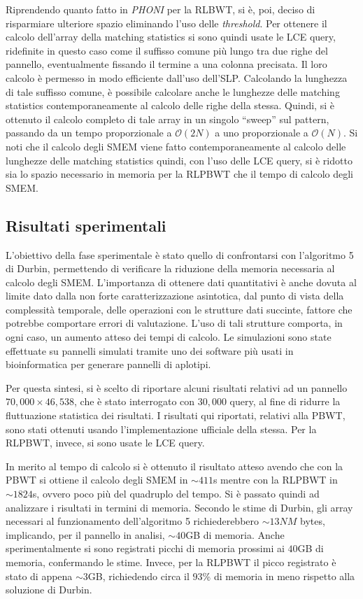 \documentclass[a4paper,11pt, oneside,italian]{article}
\begin{document}
Riprendendo quanto fatto in \textit{PHONI} per
la RLBWT, si è, poi, deciso di risparmiare ulteriore spazio eliminando
l'uso delle \textit{threshold}. Per ottenere il calcolo dell'array della
matching statistics si sono quindi usate le LCE query, ridefinite in questo caso
come il suffisso comune più lungo tra due righe del pannello, eventualmente
fissando il termine a una colonna precisata. Il loro calcolo è permesso
in modo efficiente dall'uso dell'SLP. Calcolando la
lunghezza di tale suffisso comune, è possibile calcolare anche le
lunghezze delle matching statistics contemporaneamente al calcolo delle
righe della stessa. Quindi, si è ottenuto il calcolo completo di tale array in
un singolo ``sweep'' sul pattern, passando da un tempo proporzionale a
$\mathcal{O}(2N)$ a uno proporzionale a 
$\mathcal{O}(N)$. Si noti che il calcolo degli SMEM viene fatto
contemporaneamente al calcolo delle lunghezze delle matching statistics quindi,
con l'uso delle LCE query, si è ridotto sia lo spazio necessario in memoria per
la RLPBWT che il tempo di calcolo degli SMEM.

\subsection*{Risultati sperimentali}
L'obiettivo della fase sperimentale è stato quello di confrontarsi con
l'algoritmo 5 di Durbin, permettendo di verificare la
riduzione della memoria necessaria al calcolo degli SMEM. L'importanza di ottenere
dati quantitativi è anche dovuta al limite 
dato dalla non forte caratterizzazione asintotica, dal punto di vista della
complessità temporale, delle operazioni con le strutture dati succinte, fattore
che potrebbe comportare errori di 
valutazione. L'uso di tali strutture comporta, in ogni caso, un aumento atteso
dei tempi di calcolo. Le simulazioni sono state effettuate su pannelli simulati
tramite uno dei software più usati in bioinformatica per generare pannelli di
aplotipi. 

Per questa sintesi, si è scelto di riportare alcuni risultati relativi ad un
pannello $70,000 \times 46,538$, che è stato interrogato con $30,000$ query, al
fine di ridurre la fluttuazione statistica dei risultati.
I risultati qui riportati, relativi alla PBWT, sono stati ottenuti usando
l'implementazione ufficiale della stessa. Per la RLPBWT, invece, si sono usate
le LCE query. 

In merito al tempo di calcolo si è ottenuto il risultato atteso avendo che con
la PBWT si ottiene il calcolo degli SMEM in $\sim 411$s 
mentre con la RLPBWT in $\sim 1824$s, ovvero poco più del quadruplo del tempo.
Si è passato quindi ad analizzare i risultati in termini di memoria. Secondo le
stime di Durbin, gli array necessari al funzionamento dell'algoritmo 5
richiederebbero $\sim 13NM$ bytes, implicando, per il pannello in analisi, $\sim
40$GB di memoria. Anche sperimentalmente si sono registrati 
picchi di memoria prossimi ai $40$GB di memoria, confermando le stime. Invece,
per la RLPBWT il picco registrato è stato di appena $\sim 3$GB, richiedendo
circa il $93$\% di memoria in meno rispetto alla soluzione di Durbin.
\end{document}

